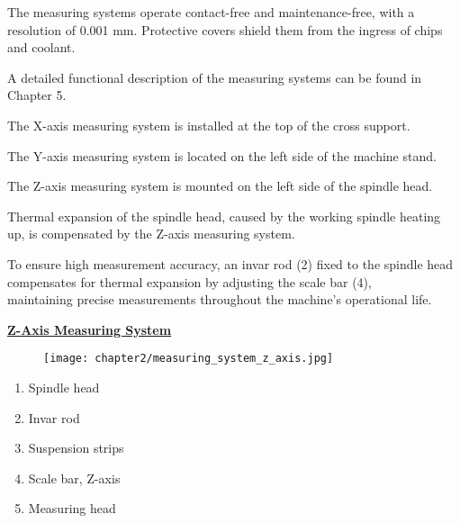The measuring systems operate contact-free and maintenance-free, with a \\resolution of 0.001 mm. Protective covers shield them from the ingress of chips and coolant.

\vspace{0.3cm}

\noindent A detailed functional description of the measuring systems can be found in Chapter 5.

\vspace{0.3cm}

\noindent The X-axis measuring system is installed at the top of the cross support.

\vspace{0.3cm}

\noindent The Y-axis measuring system is located on the left side of the machine stand.

\vspace{0.3cm}

\noindent The Z-axis measuring system is mounted on the left side of the spindle head.

\vspace{0.3cm}

\noindent Thermal expansion of the spindle head, caused by the working spindle heating up, is compensated by the Z-axis measuring system.

\vspace{0.3cm}

\noindent To ensure high measurement accuracy, an invar rod (2) fixed to the spindle head compensates for thermal expansion by adjusting the scale bar (4), \\maintaining precise measurements throughout the machine's operational life.

\vspace{0.5cm}

\noindent\textbf{\uline{Z-Axis Measuring System}}

\begin{figure}[h]
    \centering
    \texttt{[image: chapter2/measuring\_system\_z\_axis.jpg]}
    \caption{}
    \label{fig:measuring_system_z}
\end{figure}

\begin{enumerate}[itemsep=1pt,parsep=0pt]
    \item Spindle head
    \item Invar rod
    \item Suspension strips
    \item Scale bar, Z-axis
    \item Measuring head
\end{enumerate}

